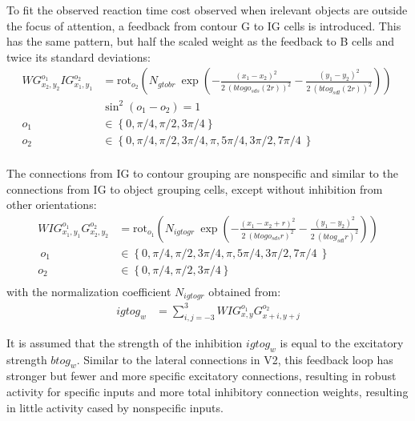 To fit the observed reaction time cost observed when irelevant objects
are outside the focus of attention, a feedback
from contour G to IG cells is
introduced. This has the same pattern, but half the scaled weight as the
feedback to B cells and twice its standard
deviations: 
\begin{align}
	WG^{o_1}_{x_2,y_2}IG^{o_2}_{x_1,y_1}&=\text{rot}_{o_2}\left(N_{gtobr}\: \exp\left(-\frac{(x_1-x_2)^2}{2\: (btogo_{sds} (2r))^2}
	-\frac{(y_1-y_2)^2}{2\: (btog_{sdl} (2r))^2}\right)\right) \  \nonumber\\
	   	 &\sin^2(o_1-o_2) = 1 \nonumber\\
		 o_1&\in \left\{0,\pi/4,\pi/2,3\pi/4 \right\} \nonumber\\
	 o_2&\in \left\{0,\pi/4,\pi/2,3\pi/4,\pi,5\pi/4,3\pi/2,7\pi/4\ \right\} \nonumber\\
\end{align}

The connections from IG to contour grouping are nonspecific and similar to the connections from IG to object grouping cells, except without inhibition from other orientations:
\begin{align}
  WIG^{o_1}_{x_1,y_1}G^{o_2}_{x_2,y_2}&=\text{rot}_{o_1}\left(N_{igtogr}\:
          \exp\left(-\frac{(x_1-x_2+r)^2}{2\: (btogo_{sds} r)^2}
                  -\frac{(y_1-y_2)^2}{2\: (btog_{sdl} r)^2}\right)\right) \nonumber\\ \ 
	 o_1&\in \left\{0,\pi/4,\pi/2,3\pi/4,\pi,5\pi/4,3\pi/2,7\pi/4\ \right\} \nonumber\\
	 o_2&\in \left\{0,\pi/4,\pi/2,3\pi/4 \right\} \nonumber\\
\end{align}
with the normalization coefficient $N_{igtogr}$ obtained from:
\begin{align}
	igtog_w&=\sum^{3}_{i,j=-3} WIG^{o_1}_{x,y}G^{o_2}_{x+i,y+j} 	
\end{align}

It is assumed that the strength of the inhibition $igtog_w$ is equal to the excitatory strength $btog_w$. Similar to the lateral connections in V2, this feedback loop has stronger but fewer and more specific excitatory connections, resulting in robust activity for specific inputs and more total inhibitory connection weights, resulting in
little activity cased by nonspecific inputs.

